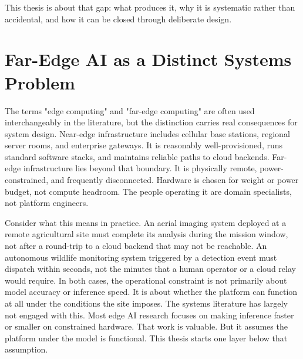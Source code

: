 This thesis is about that gap: what produces it, why it is systematic rather than accidental, and how it can be closed through deliberate design.
\section{Far-Edge AI as a Distinct Systems Problem}
\label{sec:far_edge_ai}
The terms "edge computing" and "far-edge computing" are often used interchangeably in the literature, but the distinction carries real consequences for system design. Near-edge infrastructure includes cellular base stations, regional server rooms, and enterprise gateways. It is reasonably well-provisioned, runs standard software stacks, and maintains reliable paths to cloud backends. Far-edge infrastructure lies beyond that boundary. It is physically remote, power-constrained, and frequently disconnected. Hardware is chosen for weight or power budget, not compute headroom. The people operating it are domain specialists, not platform engineers.

Consider what this means in practice. An aerial imaging system deployed at a remote agricultural site must complete its analysis during the mission window, not after a round-trip to a cloud backend that may not be reachable. An autonomous wildlife monitoring system triggered by a detection event must dispatch within seconds, not the minutes that a human operator or a cloud relay would require. In both cases, the operational constraint is not primarily about model accuracy or inference speed. It is about whether the platform can function at all under the conditions the site imposes.
The systems literature has largely not engaged with this. Most edge AI research focuses on making inference faster or smaller on constrained hardware. That work is valuable. But it assumes the platform under the model is functional. This thesis starts one layer below that assumption.

